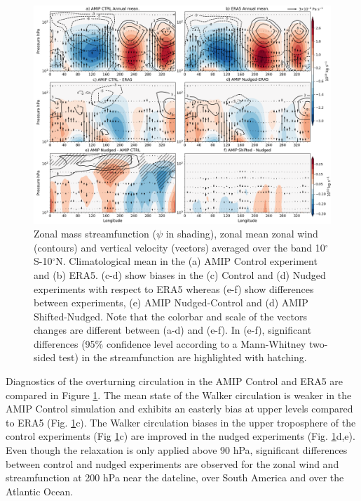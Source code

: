 \begin{figure}[t!]
\centering
 \includegraphics[width=\linewidth]{figures/suite_streamwalkerclim.png}
\caption[Walker in atmosphere-only experiments]{Zonal mass streamfunction ($\psi$ in shading), zonal mean zonal wind (contours) and vertical velocity (vectors) averaged over the band 10$^\circ$S-10$^\circ$N. Climatological mean in the (a) AMIP Control experiment and (b) ERA5. (c-d) show biases in the (c) Control and (d) Nudged experiments with respect to ERA5 whereas (e-f) show differences between experiments, (e) AMIP Nudged-Control and (d) AMIP Shifted-Nudged. Note that the colorbar and scale of the vectors changes are different between (a-d) and (e-f). In (e-f), significant differences (95\% confidence level according to a Mann-Whitney two-sided test) in the streamfunction are highlighted with hatching. }
\label{fig:walkeramip}
\end{figure}


Diagnostics of the overturning circulation in the AMIP Control and ERA5 are compared in Figure \ref{fig:walkeramip}. The mean state of the Walker circulation is weaker in the AMIP Control simulation and exhibits an easterly bias at upper levels compared to ERA5 (Fig. \ref{fig:walkeramip}c). The Walker circulation biases in the upper troposphere of the control experiments (Fig \ref{fig:walkeramip}c) are improved in the nudged experiments (Fig. \ref{fig:walkeramip}d,e). Even though the relaxation is only applied above 90 hPa, significant differences between control and nudged experiments are observed for the zonal wind and streamfunction at 200 hPa near the dateline, over South America and over the Atlantic Ocean. 

